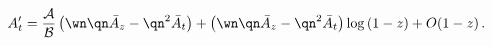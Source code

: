 \begin{equation}
A_t' = { {\cal A}\over {\cal B}} \left( \wn \qn \bar{A}_z - \qn^2 
\bar{A}_t \right)
+  \left(  \wn \qn \bar{A}_z - \qn^2 \bar{A}_t \right) \log{(1-z)} + O(1-z)\,. 
\end{equation}

